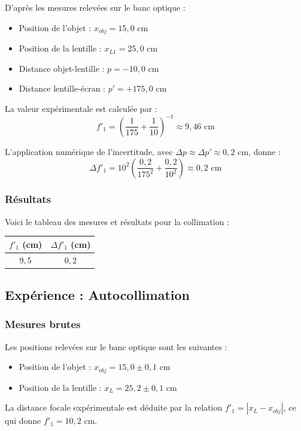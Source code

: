 D'après les mesures relevées sur le banc optique :
\begin{itemize}
    \item Position de l'objet : $x_{obj} = 15,0$ cm
    \item Position de la lentille : $x_{L1} = 25,0$ cm
    \item Distance objet-lentille : $p = -10,0$ cm
    \item Distance lentille-écran : $p' = +175,0$ cm
\end{itemize}

La valeur expérimentale est calculée par :
\begin{equation}
    f'_1 = \left( \frac{1}{175} + \frac{1}{10} \right)^{-1} \approx 9,46 \text{ cm}
\end{equation}

L'application numérique de l'incertitude,
avec $\Delta p \approx \Delta p' \approx 0,2$ cm, donne :
\begin{equation}
    \Delta f'_1 = 10^2 \left( \frac{0,2}{175^2} + \frac{0,2}{10^2} \right) \approx 0,2 \text{ cm}
\end{equation}

\subsubsection{Résultats}

Voici le tableau des mesures et résultats pour la collimation :

\begin{center}
\begin{tabular}{|c|c|}
    \hline
    $f'_1$ (cm) & $\Delta f'_1$ (cm) \\
    \hline
    $9,5$ & $0,2$ \\
    \hline
\end{tabular}
\end{center}

\subsection{Expérience : Autocollimation}

\subsubsection{Mesures brutes}
Les positions relevées sur le banc optique sont les suivantes : 
\begin{itemize}
    \item Position de l'objet : $x_{obj} = 15,0 \pm 0,1$ cm 
    \item Position de la lentille : $x_{L} = 25,2 \pm 0,1$ cm 
\end{itemize}
La distance focale expérimentale est déduite par la relation $f'_{1} = |x_{L} - x_{obj}|$, 
ce qui donne $f'_{1} = 10,2$ cm. 

